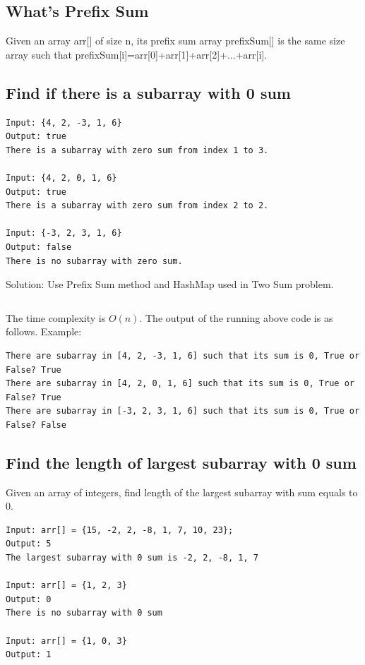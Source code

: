 \documentclass[11pt]{article}
\begin{document}
\subsection{What's Prefix Sum}
Given an array arr[] of size n, its prefix sum array prefixSum[] is the same size array such that prefixSum[i]=arr[0]+arr[1]+arr[2]+...+arr[i].
\subsection{Find if there is a subarray with 0 sum}

\begin{verbatim}
Input: {4, 2, -3, 1, 6}
Output: true 
There is a subarray with zero sum from index 1 to 3.

Input: {4, 2, 0, 1, 6}
Output: true 
There is a subarray with zero sum from index 2 to 2.

Input: {-3, 2, 3, 1, 6}
Output: false
There is no subarray with zero sum.
\end{verbatim}

Solution: Use Prefix Sum method and HashMap used in Two Sum problem. 

\inputminted[breaklines=true,frame=leftline, linenos=true]{python}{src/subarraySum0.py}

The time complexity is $O(n)$.
The output of the running above code is as follows. 
Example:
\begin{verbatim}
There are subarray in [4, 2, -3, 1, 6] such that its sum is 0, True or False? True
There are subarray in [4, 2, 0, 1, 6] such that its sum is 0, True or False? True
There are subarray in [-3, 2, 3, 1, 6] such that its sum is 0, True or False? False
\end{verbatim}

\subsection{Find the length of largest subarray with 0 sum}
Given an array of integers, find length of the largest subarray with sum equals to 0.
\begin{verbatim}
Input: arr[] = {15, -2, 2, -8, 1, 7, 10, 23};
Output: 5
The largest subarray with 0 sum is -2, 2, -8, 1, 7

Input: arr[] = {1, 2, 3}
Output: 0
There is no subarray with 0 sum

Input: arr[] = {1, 0, 3}
Output: 1
\end{verbatim}
\end{document}
